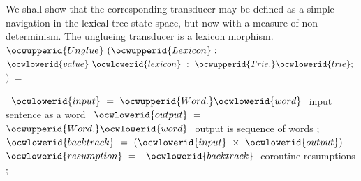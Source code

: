 \documentclass[12pt]{article}
\begin{document}
We shall show that the corresponding transducer may be defined as a simple
navigation in the lexical tree state space, but now with a measure of
non-determinism. The unglueing transducer is a lexicon morphism. 
\ocweol
\label{../ML/unglue.ml:1087}%
\medskip
\ocwbegincode{}\ocwindent{0.00em}
~$\ocwupperid{Unglue}~(\ocwupperid{Lexicon}:~$~$\ocwlowerid{value}~\ocwlowerid{lexicon}~:~\ocwupperid{Trie.}\ocwlowerid{trie};~$$)~=~$\medskip

\label{../ML/unglue.ml:1157}%
\ocwindent{0.00em}
~$\ocwlowerid{input}~=~\ocwupperid{Word.}\ocwlowerid{word}~$\ocwbc{} input sentence as a word    \ocwec{}\ocweol
\ocwindent{0.00em}
~$\ocwlowerid{output}~=~$~$\ocwupperid{Word.}\ocwlowerid{word}~$\ocwbc{} output is sequence of words \ocwec{}\ocweol
\ocwindent{0.00em}
;\ocweol
\ocwindent{0.00em}
~$\ocwlowerid{backtrack}~=~(\ocwlowerid{input}~\times{}~\ocwlowerid{output})$\ocweol
\ocwindent{0.00em}
~$\ocwlowerid{resumption}~=~$~$\ocwlowerid{backtrack}~$\ocwbc{} coroutine resumptions \ocwec{}\ocweol
\ocwindent{0.00em}
;\medskip
\end{document}
